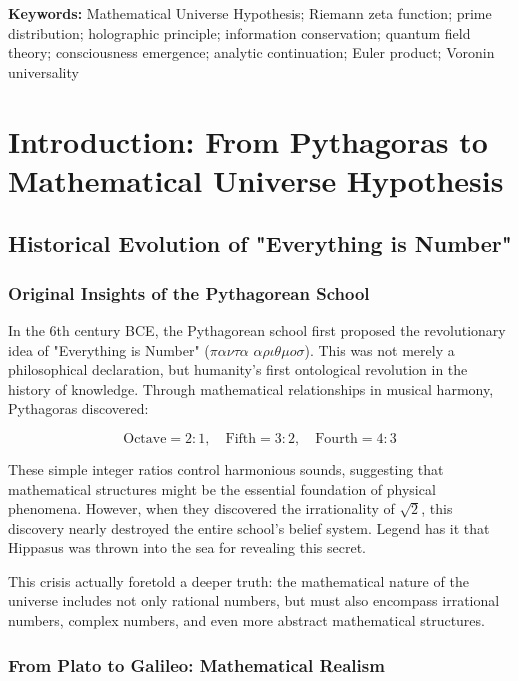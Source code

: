 \documentclass[12pt]{article}
\theoremstyle{plain}
\theoremstyle{definition}
\begin{document}
\textbf{Keywords:} Mathematical Universe Hypothesis; Riemann zeta function; prime distribution; holographic principle; information conservation; quantum field theory; consciousness emergence; analytic continuation; Euler product; Voronin universality

\section{Introduction: From Pythagoras to Mathematical Universe Hypothesis}

\subsection{Historical Evolution of "Everything is Number"}

\subsubsection{Original Insights of the Pythagorean School}

In the 6th century BCE, the Pythagorean school first proposed the revolutionary idea of "Everything is Number" ($\pi\alpha\nu\tau\alpha$ $\alpha\rho\iota\theta\mu o\sigma$). This was not merely a philosophical declaration, but humanity's first ontological revolution in the history of knowledge. Through mathematical relationships in musical harmony, Pythagoras discovered:

\begin{equation}
\text{Octave} = 2:1, \quad \text{Fifth} = 3:2, \quad \text{Fourth} = 4:3
\end{equation}

These simple integer ratios control harmonious sounds, suggesting that mathematical structures might be the essential foundation of physical phenomena. However, when they discovered the irrationality of $\sqrt{2}$, this discovery nearly destroyed the entire school's belief system. Legend has it that Hippasus was thrown into the sea for revealing this secret.

This crisis actually foretold a deeper truth: the mathematical nature of the universe includes not only rational numbers, but must also encompass irrational numbers, complex numbers, and even more abstract mathematical structures.

\subsubsection{From Plato to Galileo: Mathematical Realism}
\end{document}
